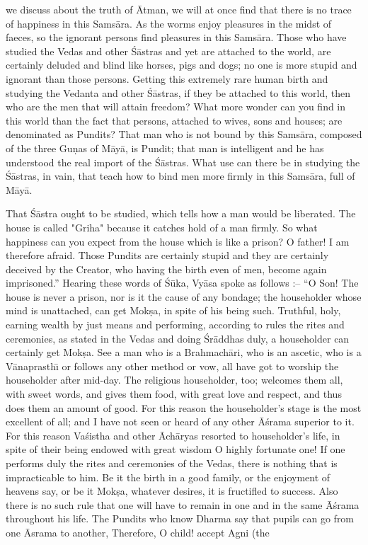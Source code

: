 we discuss about the truth of \=Atman, we will at once find that there is no trace of happiness in this Sams\=ara. As the worms enjoy pleasures in the midst of faeces, so the ignorant persons find pleasures in this Sams\=ara. Those who have studied the Vedas and other \'S\=astras and yet are attached to the world, are certainly deluded and blind like horses, pigs and dogs; no one is more stupid and ignorant than those persons. Getting this extremely rare human birth and studying the Vedanta and other \'S\=astras, if they be attached to this world, then who are the men that will attain freedom? What more wonder can you find in this world than the fact that persons, attached to wives, sons and houses; are denominated as Pundits? That man who is not bound by this Sams\=ara, composed of the three Gu\d{n}as of M\=ay\=a, is Pundit; that man is intelligent and he has understood the real import of the \'S\=astras. What use can there be in studying the \'S\=astras, in vain, that teach how to bind men more firmly in this Sams\=ara, full of M\=ay\=a.

That \'S\=astra ought to be studied, which tells how a man would be liberated. The house is called "Griha" because it catches hold of a man firmly. So what happiness can you expect from the house which is like a prison? O father! I am therefore afraid. Those Pundits are certainly stupid and they are certainly deceived by the Creator, who having the birth even of men, become again imprisoned.'' Hearing these words of \'S\=uka, Vy\=asa spoke as follows :-- ``O Son! The house is never a prison, nor is it the cause of any bondage; the householder whose mind is unattached, can get Mok\d{s}a, in spite of his being such. Truthful, holy, earning wealth by just means and performing, according to rules the rites and ceremonies, as stated in the Vedas and doing \'Sr\=addhas duly, a householder can certainly get Mok\d{s}a. See a man who is a Brahmach\=ari, who is an ascetic, who is a V\=anaprasth\={\i} or follows any other method or vow, all have got to worship the householder after mid-day. The religious householder, too; welcomes them all, with sweet words, and gives them food, with great love and respect, and thus does them an amount of good. For this reason the householder's stage is the most excellent of all; and I have not seen or heard of any other \=A\'srama superior to it. For this reason Va\'sistha and other \=Ach\=aryas resorted to householder's life, in spite of their being endowed with great wisdom O highly fortunate one! If one performs duly the rites and ceremonies of the Vedas, there is nothing that is impracticable to him. Be it the birth in a good family, or the enjoyment of heavens say, or be it Mok\d{s}a, whatever desires, it is fructifled to success. Also there is no such rule that one will have to remain in one and in the same \=A\'srama throughout his life. The Pundits who know Dharma say that pupils can go from one \=Asrama to another, Therefore, O child! accept Agni (the

